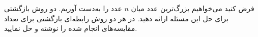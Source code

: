 \EXERCISE
فرض کنید می‌خواهیم بزرگ‌ترین عدد میان
$n$
عدد را به‌دست آوریم. دو روش بازگشتی برای حل این مسئله ارائه دهید. در هر دو روش رابطه‌ای بازگشتی برای تعداد مقایسه‌های انجام شده را نوشته و حل نمایید.
